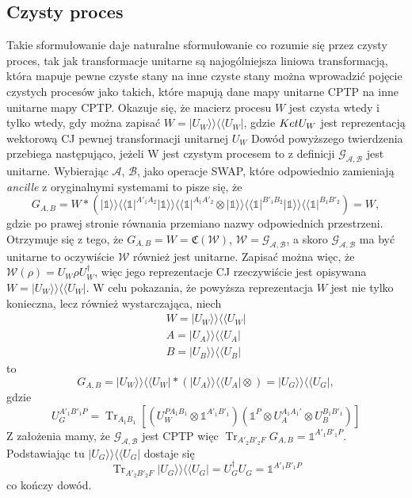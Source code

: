 \documentclass[10pt]{article} %
\DeclareMathOperator{\Trs}{Tr}
\newcommand{\Ket}[1]{|#1\rangle}
\newcommand{\BBra}[1]{\langle\langle#1|}
\newcommand{\KKet}[1]{|#1\rangle\rangle}
\newcommand{\I}{\mathbb{1}}
\newcommand{\MCJ}{\mathfrak{C}}
\begin{document}
\subsection{Czysty proces}
Takie sformułowanie daje naturalne sformułowanie co rozumie się przez czysty proces, tak jak transformacje unitarne są najogólniejsza liniowa transformacją, która mapuje pewne czyste stany na inne czyste stany można wprowadzić pojęcie czystych procesów jako takich, które mapują dane mapy unitarne CPTP na inne unitarne mapy CPTP. 
Okazuje się, że macierz procesu $W$ jest czysta wtedy i tylko wtedy, gdy można zapisać $W = \KKet{U_W} \BBra{U_W}$, gdzie $\\Ket{U_W}$ jest reprezentacją wektorową CJ pewnej transformacji unitarnej $U_W$
Dowód powyższego twierdzenia przebiega następująco, jeżeli W jest czystym procesem to z definicji $\mathcal{G_{A,B}}$ jest unitarne. Wybierając $\mathcal{A}$, $\mathcal{B}$, jako operacje SWAP, które odpowiednio zamieniają \textit{ancille} z oryginalnymi systemami to pisze się, że
\begin{equation}
G_{A,B} = W * \left( \KKet{\I}\BBra{\I}^{A'_1 A_2} \KKet{\I}\BBra{\I}^{A_1A'_2} \otimes \KKet{\I}\BBra{\I}^{B'_1 B_2} \KKet{\I}\BBra{\I}^{B_1B'_2}\right) = W,
\end{equation}
gdzie po prawej stronie równania przemiano nazwy odpowiednich przestrzeni. Otrzymuje się z tego, że $G_{A,B} = W = \MCJ (\mathcal{W})$, $\mathcal{W} = \mathcal{G_{A,B}}$, a skoro $\mathcal{G_{A,B}}$ ma być unitarne to oczywiście $\mathcal{W}$ również jest unitarne.
Zapisać można więc, że $\mathcal{W}(\rho) = U_W\rho U_W^\dag$, więc jego reprezentacje CJ rzeczywiście jest opisywana $W = \KKet{U_W}\BBra{U_W}$. W celu pokazania, że powyższa reprezentacja $W$ jest nie tylko konieczna, lecz również wystarczająca, niech
\begin{gather}
W = \KKet{U_W}\BBra{U_W} \\
A = \KKet{U_A}\BBra{U_A} \\
B = \KKet{U_B}\BBra{U_B}
\end{gather}
to
\begin{equation}
G_{A,B} = \KKet{U_W}\BBra{U_W} * \left( \KKet{U_A}\BBra{U_A} \otimes \right) = \KKet{U_G}\BBra{U_G},
\end{equation} gdzie 
\begin{equation}
U_G^{A'_1B'_1P} = \Trs_{A_1B_1} \left[ \left( U_W^{PA_1B_1} \otimes \I^{A'_1B'_1}\right) \left( \I^P \otimes U_A^{A_1A_1'} \otimes U_B^{B_1B'_1}\right)\right]
\end{equation}
Z założenia mamy, że $\mathcal{G_{A,B}}$ jest CPTP więc $\Trs_{A'_2B'_2F} G_{A,B} = \I^{A'_1B'_1P}$. Podstawiając tu $\KKet{U_G}\BBra{U_G}$ dostaje się
\begin{equation}
\Trs_{A'_2B'_2F} \KKet{U_G}\BBra{U_G} = U^\dag_G U_G = \I^{A'_1B'_1P}
\end{equation}
co kończy dowód.
\end{document}
